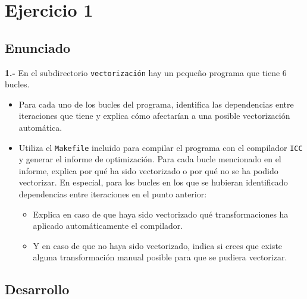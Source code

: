 \section{Ejercicio 1}
\subsection{Enunciado}
\begin{ejer}
    \textbf{1.-} En el subdirectorio \texttt{vectorización} hay un pequeño programa que tiene 6 bucles.
    \begin{itemize}
        \item Para cada uno de los bucles del programa, identifica las dependencias entre iteraciones que tiene
    y explica cómo afectarían a una posible vectorización automática.
        \item Utiliza el \texttt{Makefile} incluido para compilar el programa con el compilador \texttt{ICC} y generar
    el informe de optimización. Para cada bucle mencionado en el informe, explica por qué ha sido vectorizado o por qué no 
    se ha podido vectorizar. En especial, para los bucles en los que se hubieran identificado dependencias entre iteraciones
     en el punto anterior:
        \begin{itemize}
            \item Explica en caso de que haya sido vectorizado qué transformaciones ha aplicado automáticamente el compilador.
            \item Y en caso de que no haya sido vectorizado, indica si crees que existe alguna transformación manual posible para
            que se pudiera vectorizar.
        \end{itemize}
    \end{itemize}
\end{ejer}
\subsection{Desarrollo}
